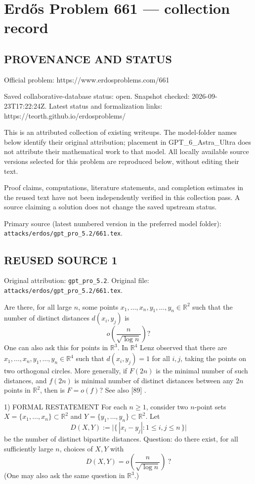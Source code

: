 \section*{Erd\H{o}s Problem 661 --- collection record}

\subsection*{PROVENANCE AND STATUS}
Official problem: https://www.erdosproblems.com/661

Saved collaborative-database status: open.
Snapshot checked: 2026-09-23T17:22:24Z.
Latest status and formalization links: https://teorth.github.io/erdosproblems/

This is an attributed collection of existing writeups. The model-folder names below identify their original attribution; placement in GPT\_6\_Astra\_Ultra does not attribute their mathematical work to that model. All locally available source versions selected for this problem are reproduced below, without editing their text.

Proof claims, computations, literature statements, and completion estimates in the reused text have not been independently verified in this collection pass. A source claiming a solution does not change the saved upstream status.

Primary source (latest numbered version in the preferred model folder): \texttt{attacks/erdos/gpt\_pro\_5.2/661.tex}.

\subsection*{REUSED SOURCE 1}
Original attribution: \texttt{gpt\_pro\_5.2}.
Original file: \texttt{attacks/erdos/gpt\_pro\_5.2/661.tex}.


Are there, for all large $n$, some points $x_1,\ldots,x_n,y_1,\ldots,y_n\in \mathbb{R}^2$ such that the number of distinct distances $d(x_i,y_j)$ is\[o\left(\frac{n}{\sqrt{\log n}}\right)?\] One can also ask this for points in $\mathbb{R}^3$. In $\mathbb{R}^4$ Lenz observed that there are $x_1,\ldots,x_n,y_1,\ldots,y_n\in \mathbb{R}^4$ such that $d(x_i,y_j)=1$ for all $i,j$, taking the points on two orthogonal circles. More generally, if $F(2n)$ is the minimal number of such distances, and $f(2n)$ is minimal number of distinct distances between any $2n$ points in $\mathbb{R}^2$, then is $F =o(f)$? See also [89] .


1) FORMAL RESTATEMENT
For each $n\ge 1$, consider two $n$-point sets $X=\{x_1,\ldots,x_n\}\subset\mathbb{R}^2$ and $Y=\{y_1,\ldots,y_n\}\subset\mathbb{R}^2$.
Let
\[
D(X,Y):=\bigl|\{\,|x_i-y_j|:1\le i,j\le n\,\}\bigr|
\]
be the number of distinct bipartite distances.
Question: do there exist, for all sufficiently large $n$, choices of $X,Y$ with
\[
D(X,Y)=o\!\left(\frac{n}{\sqrt{\log n}}\right)\ ?
\]
(One may also ask the same question in $\mathbb{R}^3$.)

